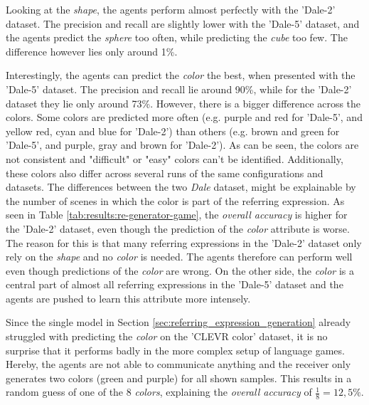 Looking at the \emph{shape}, the agents perform almost perfectly with the 'Dale-2' dataset.
The precision and recall are slightly lower with the 'Dale-5' dataset, and the agents predict the \emph{sphere} too often, while predicting the \emph{cube} too few.
The difference however lies only around 1\%.

Interestingly, the agents can predict the \emph{color} the best, when presented with the 'Dale-5' dataset.
The precision and recall lie around 90\%, while for the 'Dale-2' dataset they lie only around 73\%.
However, there is a bigger difference across the colors.
Some colors are predicted more often (e.g. purple and red for 'Dale-5', and yellow red, cyan and blue for 'Dale-2') than others (e.g. brown and green for 'Dale-5', and purple, gray and brown for 'Dale-2').
As can be seen, the colors are not consistent and "difficult" or "easy" colors can't be identified.
Additionally, these colors also differ across several runs of the same configurations and datasets.
The differences between the two \emph{Dale} dataset, might be explainable by the number of scenes in which the color is part of the referring expression.
As seen in Table \ref{tab:results:re-generator-game}, the \emph{overall accuracy} is higher for the 'Dale-2' dataset, even though the prediction of the \emph{color} attribute is worse.
The reason for this is that many referring expressions in the 'Dale-2' dataset only rely on the \emph{shape} and no \emph{color} is needed.
The agents therefore can perform well even though predictions of the \emph{color} are wrong.
On the other side, the \emph{color} is a central part of almost all referring expressions in the 'Dale-5' dataset and the agents are pushed to learn this attribute more intensely.

Since the single model in Section \ref{sec:referring_expression_generation} already struggled with predicting the \emph{color} on the 'CLEVR color' dataset, it is no surprise that it performs badly in the more complex setup of language games.
Hereby, the agents are not able to communicate anything and the receiver only generates two colors (green and purple) for all shown samples.
This results in a random guess of one of the 8 \emph{colors}, explaining the \emph{overall accuracy} of $\frac{1}{8}=12,5\%$.


